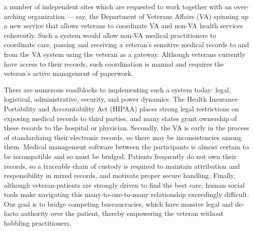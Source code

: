 a number of independent sites which are requested to work together with an over-arching organization --- say, the Department of Veterans Affairs (VA) spinning up a new service that allows veterans to coordinate VA and non-VA health services coherently.
Such a system would allow non-VA medical practitioners to coordinate care, passing and receiving a veteran's sensitive medical records to and from the VA system using the veteran as a gateway.
Although veterans currently have access to their records, such coordination is manual and requires the veteran's active management of paperwork.

There are numerous roadblocks to implementing such a system today: legal, logistical, administrative, security, and power dynamics.
The Health Insurance Portability and Accountability Act (HIPAA) places strong legal restrictions on exposing medical records to third parties, and many states grant ownership of these records to the hospital or physician.
Secondly, the VA is early in the process of standardizing their electronic records, so there may be inconsistencies among them.
Medical management software between the participants is almost certain to be incompatible and so must be bridged.
Patients frequently do not own their records, so a traceable chain of custody is required to maintain attribution and responsibility in mixed records, and motivate proper secure handling.
Finally, although veteran-patients are strongly driven to find the best care, human social tools make navigating this many-to-one-to-many relationship exceedingly difficult.
Our goal is to bridge competing bureaucracies, which have massive legal and de-facto authority over the patient, thereby empowering the veteran without hobbling practitioners.
